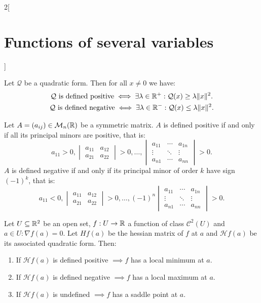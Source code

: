 \documentclass[../../../main.tex]{subfiles}
\begin{document}
\begin{multicols}{2}[\section{Functions of several variables}]
\begin{definition}
\end{definition}
\begin{theorem}
Let $\mathcal{Q}$ be a quadratic form. Then for all $x\ne 0$ we have:
\begin{gather*}
    \mathcal{Q}\text{ is defined positive}\iff\exists\lambda\in\mathbb{R}^+:\mathcal{Q}(x)\geq\lambda\|x\|^2.\\
    \mathcal{Q}\text{ is defined negative}\iff\exists\lambda\in\mathbb{R}^-:\mathcal{Q}(x)\leq\lambda\|x\|^2.
\end{gather*}
\end{theorem}
\begin{prop}
Let $A=(a_{ij})\in\mathcal{M}_n(\mathbb{R} )$ be a symmetric matrix. $A$ is defined positive if and only if all its principal minors are positive, that is: $$a_{11}>0,\begin{vmatrix}
a_{11} & a_{12}\\
a_{21} & a_{22} \end{vmatrix}>0,\ldots,
\begin{vmatrix}
a_{11} &\cdots & a_{1n}\\
\vdots & \ddots & \vdots \\
a_{n1} & \cdots & a_{nn}
\end{vmatrix}>0.$$ $A$ is defined negative if and only if its principal minor of order $k$ have sign $(-1)^k$, that is: $$a_{11}<0,
\begin{vmatrix}
a_{11} & a_{12}\\
a_{21} & a_{22}
\end{vmatrix}>0,\ldots,
(-1)^n\begin{vmatrix}
a_{11} &\cdots & a_{1n}\\
\vdots & \ddots & \vdots \\
a_{n1} & \cdots & a_{nn}
\end{vmatrix}>0.$$
\end{prop}
\begin{theorem}
Let $U\subseteq\mathbb{R}^2$ be an open set, $f:U\rightarrow\mathbb{R} $ a function of class $\mathcal{C}^2(U)$ and $a\in U:\nabla f(a)=0$. Let $Hf(a)$ be the hessian matrix of $f$ at $a$ and $\mathcal{H}f(a)$ be its associated quadratic form. Then:
\begin{enumerate}
    \item If $\mathcal{H}f(a)$ is defined positive $\implies f$ has a local minimum at $a$.
    \item If $\mathcal{H}f(a)$ is defined negative $\implies f$ has a local maximum at $a$.
    \item If $\mathcal{H}f(a)$ is undefined $\implies f$ has a saddle point at $a$.

\end{enumerate}
\end{theorem}
\end{multicols}
\end{document}
